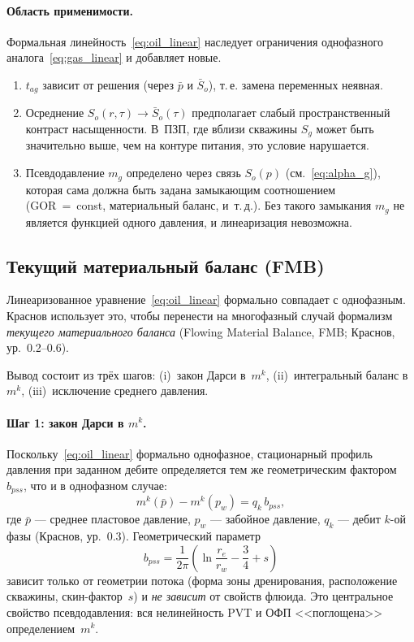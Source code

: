 ﻿\documentclass[12pt,a4paper]{article}
\begin{document}
\paragraph{Область применимости.}
Формальная линейность~\eqref{eq:oil_linear} наследует
ограничения однофазного аналога~\eqref{eq:gas_linear}
и добавляет новые.
\begin{enumerate}
\item $t_{ag}$ зависит от решения (через $\bar{p}$ и $\bar{S}_o$),
  т.\,е. замена переменных неявная.
\item Осреднение $S_o(r,\tau) \to \bar{S}_o(\tau)$ предполагает
  слабый пространственный контраст насыщенности. В~ПЗП, где
  вблизи скважины $S_g$ может быть значительно выше, чем
  на контуре питания, это условие нарушается.
\item Псевдодавление $m_g$ определено через связь $S_o(p)$
  (см.~\eqref{eq:alpha_g}), которая сама должна быть задана
  замыкающим соотношением (GOR~=~const, материальный баланс,
  и~т.\,д.). Без такого замыкания $m_g$ не является функцией
  одного давления, и линеаризация невозможна.
\end{enumerate}


\subsection{Текущий материальный баланс (FMB)}\label{ssec:FMB}

Линеаризованное уравнение~\eqref{eq:oil_linear} формально
совпадает с однофазным. Краснов использует это, чтобы
перенести на многофазный случай формализм
\emph{текущего материального баланса}
(Flowing Material Balance, FMB; Краснов, ур.~0.2--0.6).

Вывод состоит из трёх шагов: (i)~закон Дарси в~$m^k$,
(ii)~интегральный баланс в~$m^k$,
(iii)~исключение среднего давления.

\paragraph{Шаг 1: закон Дарси в $m^k$.}
Поскольку~\eqref{eq:oil_linear} формально однофазное,
стационарный профиль давления при заданном дебите
определяется тем же геометрическим фактором $b_{pss}$,
что и в однофазном случае:
\begin{equation}\label{eq:darcy_mk}
  m^k(\bar{p}) - m^k(p_w) = q_k\,b_{pss},
\end{equation}
где $\bar{p}$ --- среднее пластовое давление, $p_w$ ---
забойное давление, $q_k$ --- дебит $k$-ой фазы
(Краснов, ур.~0.3). Геометрический параметр
\begin{equation}\label{eq:bpss}
  b_{pss} = \frac{1}{2\pi}\left(\ln\frac{r_e}{r_w}
  - \frac{3}{4} + s\right)
\end{equation}
зависит только от геометрии потока (форма зоны
дренирования, расположение скважины, скин-фактор~$s$)
и \emph{не зависит} от свойств флюида. Это центральное
свойство псевдодавления: вся нелинейность PVT и ОФП
<<поглощена>> определением~$m^k$.
\end{document}
